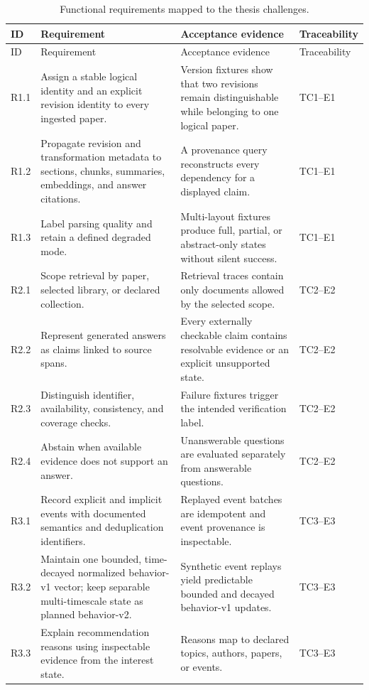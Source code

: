 \begin{longtable}{P{1.0cm}P{4.7cm}P{5.0cm}P{2.8cm}}
\caption{Functional requirements mapped to the thesis challenges.}
\label{tab:functional-requirements}\\
\toprule
ID & Requirement & Acceptance evidence & Traceability \\
\midrule
\endfirsthead
\toprule
ID & Requirement & Acceptance evidence & Traceability \\
\midrule
\endhead
R1.1 & Assign a stable logical identity and an explicit revision identity to every ingested paper. & Version fixtures show that two revisions remain distinguishable while belonging to one logical paper. & TC1--E1 \\
R1.2 & Propagate revision and transformation metadata to sections, chunks, summaries, embeddings, and answer citations. & A provenance query reconstructs every dependency for a displayed claim. & TC1--E1 \\
R1.3 & Label parsing quality and retain a defined degraded mode. & Multi-layout fixtures produce full, partial, or abstract-only states without silent success. & TC1--E1 \\
R2.1 & Scope retrieval by paper, selected library, or declared collection. & Retrieval traces contain only documents allowed by the selected scope. & TC2--E2 \\
R2.2 & Represent generated answers as claims linked to source spans. & Every externally checkable claim contains resolvable evidence or an explicit unsupported state. & TC2--E2 \\
R2.3 & Distinguish identifier, availability, consistency, and coverage checks. & Failure fixtures trigger the intended verification label. & TC2--E2 \\
R2.4 & Abstain when available evidence does not support an answer. & Unanswerable questions are evaluated separately from answerable questions. & TC2--E2 \\
R3.1 & Record explicit and implicit events with documented semantics and deduplication identifiers. & Replayed event batches are idempotent and event provenance is inspectable. & TC3--E3 \\
R3.2 & Maintain one bounded, time-decayed normalized behavior-v1 vector; keep separable multi-timescale state as planned behavior-v2. & Synthetic event replays yield predictable bounded and decayed behavior-v1 updates. & TC3--E3 \\
R3.3 & Explain recommendation reasons using inspectable evidence from the interest state. & Reasons map to declared topics, authors, papers, or events. & TC3--E3 \\

\end{longtable}
